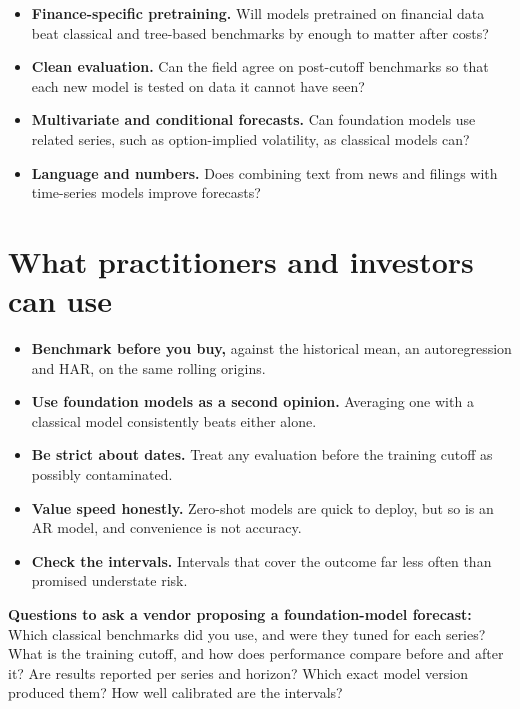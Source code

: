 \begin{itemize}
  \item \textbf{Finance-specific pretraining.} Will models pretrained on financial data beat classical and tree-based benchmarks by enough to matter after costs?
  \item \textbf{Clean evaluation.} Can the field agree on post-cutoff benchmarks so that each new model is tested on data it cannot have seen?
  \item \textbf{Multivariate and conditional forecasts.} Can foundation models use related series, such as option-implied volatility, as classical models can?
  \item \textbf{Language and numbers.} Does combining text from news and filings with time-series models improve forecasts?
\end{itemize}

\section{What practitioners and investors can use}
\label{sec:21-investors}

\begin{itemize}
  \item \textbf{Benchmark before you buy,} against the historical mean, an autoregression and HAR, on the same rolling origins.
  \item \textbf{Use foundation models as a second opinion.} Averaging one with a classical model consistently beats either alone.
  \item \textbf{Be strict about dates.} Treat any evaluation before the training cutoff as possibly contaminated.
  \item \textbf{Value speed honestly.} Zero-shot models are quick to deploy, but so is an AR model, and convenience is not accuracy.
  \item \textbf{Check the intervals.} Intervals that cover the outcome far less often than promised understate risk.
\end{itemize}

\textbf{Questions to ask a vendor proposing a foundation-model forecast:} Which classical benchmarks did you use, and were they tuned for each series? What is the training cutoff, and how does performance compare before and after it? Are results reported per series and horizon? Which exact model version produced them? How well calibrated are the intervals?

